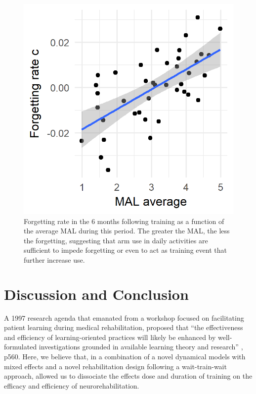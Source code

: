 \begin{figure}
	\centering
	\includegraphics[width=0.7\linewidth]{figures/Forgetting_threshold}
	\caption[Forgetting rate in the 6 months following training as a function of the average MAL during this period.]{Forgetting rate in the 6 months following training as a function of the average MAL during this period. The greater the MAL, the less the forgetting, suggesting that arm use in daily activities are sufficient to impede forgetting or even to act as training event that further increase use.}
	\label{fig:forgettingthreshold}
\end{figure}


\section{Discussion and Conclusion}
A 1997 research agenda that emanated from a workshop focused on facilitating patient learning during medical rehabilitation, proposed that “the effectiveness and efficiency of learning-oriented practices will likely be enhanced by well-formulated investigations grounded in available learning theory and research” \cite{Fuhrer1998}, p560. 
Here, we believe that, in a combination of a novel dynamical models with mixed effects and a novel rehabilitation design following a wait-train-wait approach, allowed us to dissociate the effects dose and duration of training on the efficacy and efficiency of neurorehabilitation.

